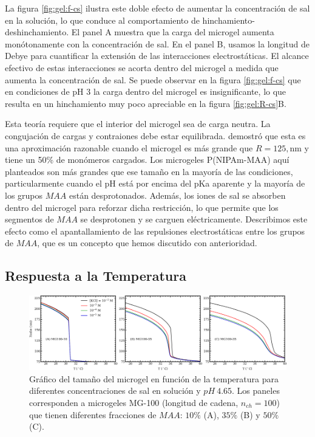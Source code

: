 La figura \ref{fig:gel:f-cs} ilustra este doble efecto de aumentar la concentraci\'on de sal en la soluci\'on, lo que conduce al comportamiento de hinchamiento-deshinchamiento. El panel A muestra que la carga del microgel aumenta mon\'otonamente con la concentraci\'on de sal. En el panel B, usamos la longitud de Debye para cuantificar la extensi\'on de las interacciones electrost\'aticas. El alcance efectivo de estas interacciones se acorta dentro del microgel a medida que aumenta la concentraci\'on de sal. Se puede observar en la figura \ref{fig:gel:f-cs} que en condiciones de pH 3 la carga dentro del microgel es insignificante, lo que resulta en un hinchamiento muy poco apreciable en la figura \ref{fig:gel:R-cs}B.

Esta teor\'ia requiere que el interior del microgel sea de carga neutra. La congujaci\'on de cargas y contraiones debe estar equilibrada. \citet{Claudio2009} demostr\'o que esta es una aproximaci\'on razonable cuando el microgel es m\'as grande que $R = 125,\text{nm}$ y tiene un 50\% de mon\'omeros cargados. Los microgeles P(NIPAm-MAA) aqu\'i planteados son m\'as grandes que ese tama\~no en la mayor\'ia de las condiciones, particularmente cuando el pH est\'a por encima del pKa aparente y la mayor\'ia de los grupos $MAA$ est\'an desprotonados. Adem\'as, los iones de sal se absorben dentro del microgel para reforzar dicha restricci\'on, lo que permite que los segmentos de $MAA$ se desprotonen y se carguen el\'ectricamente. Describimos este efecto como el apantallamiento de las repulsiones electrost\'aticas entre los grupos de $MAA$, que es un concepto que hemos discutido con anterioridad.


\subsection{Respuesta a la Temperatura}\label{sec:gel:temperature}

\begin{figure}[!htb]
	\centering
	\includegraphics[width=1\linewidth]{Figures/graph-gel/R-T.pdf}
	\caption{Gr\'afico del tama\~no del microgel en funci\'on de la temperatura para diferentes concentraciones de sal en soluci\'on y $pH~4.65$.
		Los paneles corresponden a microgeles MG-100 (longitud de cadena, $n_{ch}=100$) que tienen diferentes fracciones de $MAA$: $10\%$ (A), $35\%$ (B) y $50\%$ (C).}
	\label{fig:gel:R-T}
\end{figure}

